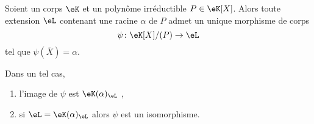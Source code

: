 \begin{proposition}          \label{PROPooVJACooNDmlfb}
    Soient un corps \( \eK\) et un polynôme irréductible \( P\in \eK[X]\). Alors toute extension \( \eL\) contenant une racine \( \alpha\) de \( P\) admet un unique morphisme de corps
            \begin{equation}
                \psi\colon \eK[X]/(P)\to \eL
            \end{equation}
            tel que \( \psi(\bar X)=\alpha\).

    Dans un tel cas,
    \begin{enumerate}
        \item
            l'image de \( \psi\) est $\eK(\alpha)_{\eL}$ ,
        \item       \label{ITEMooHRFHooWLIdWU}
            si \( \eL=\eK(\alpha)_{\eL}\) alors \( \psi\) est un isomorphisme.
    \end{enumerate}

\end{proposition}

